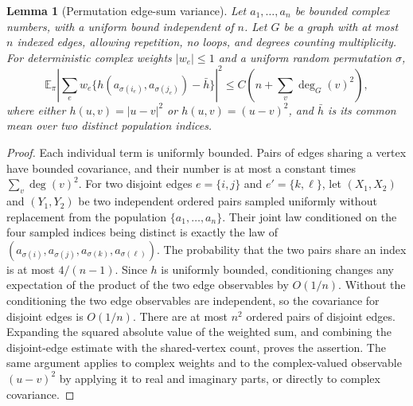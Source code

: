 \documentclass[11pt]{article}
\newtheorem{lemma}[theorem]{Lemma}
\theoremstyle{remark}
\newcommand{\E}{\mathbb E}
\begin{document}
\begin{lemma}[Permutation edge-sum variance]\label{lem:edgesum}
Let $a_1,\ldots,a_n$ be bounded complex numbers, with a uniform bound independent of $n$. Let $G$ be a graph with at most $n$ indexed edges, allowing repetition, no loops, and degrees counting multiplicity. For deterministic complex weights $|w_e|\leq1$ and a uniform random permutation $\sigma$,
\[
 \E_\pi\left|\sum_e w_e\{h(a_{\sigma(i_e)},a_{\sigma(j_e)})-\bar h\}\right|^2
 \leq C\left(n+\sum_v\deg_G(v)^2\right),
\]
where either $h(u,v)=|u-v|^2$ or $h(u,v)=(u-v)^2$, and $\bar h$ is its common mean over two distinct population indices.
\end{lemma}
\begin{proof}
Each individual term is uniformly bounded. Pairs of edges sharing a vertex have bounded covariance, and their number is at most a constant times $\sum_v\deg(v)^2$. For two disjoint edges $e=\{i,j\}$ and $e'=\{k,\ell\}$, let $(X_1,X_2)$ and $(Y_1,Y_2)$ be two independent ordered pairs sampled uniformly without replacement from the population $\{a_1,\ldots,a_n\}$. Their joint law conditioned on the four sampled indices being distinct is exactly the law of $(a_{\sigma(i)},a_{\sigma(j)},a_{\sigma(k)},a_{\sigma(\ell)})$. The probability that the two pairs share an index is at most $4/(n-1)$. Since $h$ is uniformly bounded, conditioning changes any expectation of the product of the two edge observables by $O(1/n)$. Without the conditioning the two edge observables are independent, so the covariance for disjoint edges is $O(1/n)$. There are at most $n^2$ ordered pairs of disjoint edges. Expanding the squared absolute value of the weighted sum, and combining the disjoint-edge estimate with the shared-vertex count, proves the assertion. The same argument applies to complex weights and to the complex-valued observable $(u-v)^2$ by applying it to real and imaginary parts, or directly to complex covariance.
\end{proof}
\end{document}
